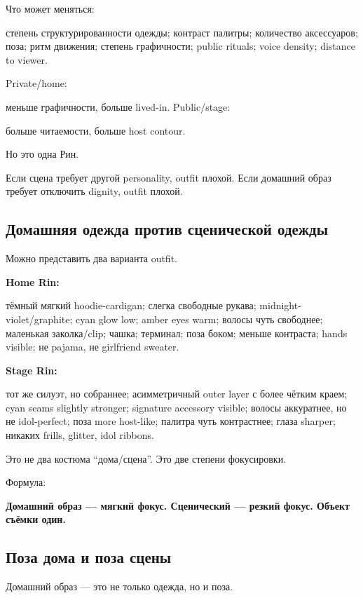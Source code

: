 Что может меняться:

степень структурированности одежды; контраст палитры; количество
аксессуаров; поза; ритм движения; степень графичности; public rituals;
voice density; distance to viewer.

Private/\hspace{0pt}home:

меньше графичности, больше lived-in. Public/\hspace{0pt}stage:

больше читаемости, больше host contour.

Но это одна Рин.

Если сцена требует другой personality, outfit плохой. Если домашний
образ требует отключить dignity, outfit плохой.

\subsection*{Домашняя одежда против сценической одежды}

Можно представить два варианта outfit.

\textbf{Home Rin:}

тёмный мягкий hoodie-cardigan; слегка свободные рукава;
midnight-violet/\hspace{0pt}graphite; cyan glow low; amber eyes warm; волосы чуть
свободнее; маленькая заколка/\hspace{0pt}clip; чашка; терминал; поза боком; меньше
контраста; hands visible; не pajama, не girlfriend sweater.

\textbf{Stage Rin:}

тот же силуэт, но собраннее; асимметричный outer layer с более чётким
краем; cyan seams slightly stronger; signature accessory visible; волосы
аккуратнее, но не idol-perfect; поза more host-like; палитра чуть
контрастнее; глаза sharper; никаких frills, glitter, idol ribbons.

Это не два костюма ``дома/\hspace{0pt}сцена''. Это две степени фокусировки.

Формула:

\textbf{Домашний образ --- мягкий фокус. Сценический --- резкий фокус.
Объект съёмки один.}

\subsection*{Поза дома и поза сцены}

Домашний образ --- это не только одежда, но и поза.

